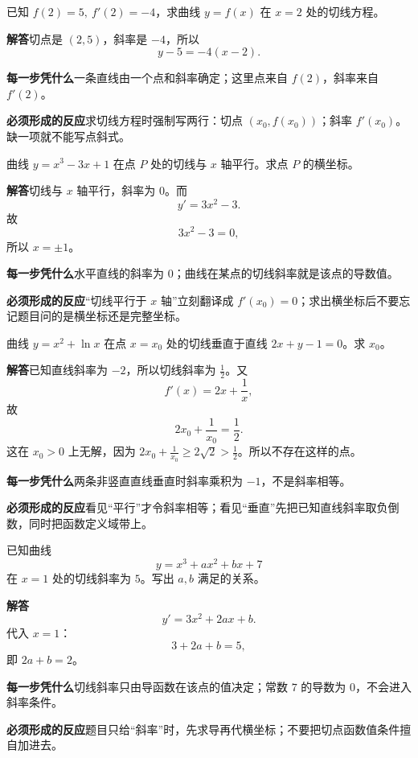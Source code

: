 \documentclass[11pt,fontset=fandol]{ctexart}
\newcommand{\answer}{\par\textbf{解答}\quad}
\newcommand{\basis}{\par\textbf{每一步凭什么}\quad}
\newcommand{\reaction}{\par\textbf{必须形成的反应}\quad}
\newenvironment{drill}[2]{
  \begin{tcolorbox}[colback=white,colframe=black!35,title={#1\quad\small #2},breakable]
}{\end{tcolorbox}}
\begin{document}
\begin{drill}{4. 切线方程需要两个信息}{甲种本《微积分初步》切线习题改编}
已知 $f(2)=5,\ f'(2)=-4$，求曲线 $y=f(x)$ 在 $x=2$ 处的切线方程。

\answer 切点是 $(2,5)$，斜率是 $-4$，所以
\[
y-5=-4(x-2).
\]

\basis 一条直线由一个点和斜率确定；这里点来自 $f(2)$，斜率来自 $f'(2)$。

\reaction 求切线方程时强制写两行：切点 $(x_0,f(x_0))$；斜率 $f'(x_0)$。缺一项就不能写点斜式。
\end{drill}

\begin{drill}{5. 与 $x$ 轴平行翻译成导数为零}{项目导数题库改编}
曲线 $y=x^3-3x+1$ 在点 $P$ 处的切线与 $x$ 轴平行。求点 $P$ 的横坐标。

\answer 切线与 $x$ 轴平行，斜率为 $0$。而
\[
y'=3x^2-3.
\]
故
\[
3x^2-3=0,
\]
所以 $x=\pm1$。

\basis 水平直线的斜率为 $0$；曲线在某点的切线斜率就是该点的导数值。

\reaction “切线平行于 $x$ 轴”立刻翻译成 $f'(x_0)=0$；求出横坐标后不要忘记题目问的是横坐标还是完整坐标。
\end{drill}

\begin{drill}{6. 垂直不是斜率相等}{项目导数题库改编}
曲线 $y=x^2+\ln x$ 在点 $x=x_0$ 处的切线垂直于直线 $2x+y-1=0$。求 $x_0$。

\answer 已知直线斜率为 $-2$，所以切线斜率为 $\frac12$。又
\[
f'(x)=2x+\frac1x,
\]
故
\[
2x_0+\frac1{x_0}=\frac12.
\]
这在 $x_0>0$ 上无解，因为 $2x_0+\frac1{x_0}\ge2\sqrt2>\frac12$。所以不存在这样的点。

\basis 两条非竖直直线垂直时斜率乘积为 $-1$，不是斜率相等。

\reaction 看见“平行”才令斜率相等；看见“垂直”先把已知直线斜率取负倒数，同时把函数定义域带上。
\end{drill}

\begin{drill}{7. 常数项求导后消失}{甲种本《微积分初步》求导习题改编}
已知曲线
\[
y=x^3+ax^2+bx+7
\]
在 $x=1$ 处的切线斜率为 $5$。写出 $a,b$ 满足的关系。

\answer
\[
y'=3x^2+2ax+b.
\]
代入 $x=1$：
\[
3+2a+b=5,
\]
即 $2a+b=2$。

\basis 切线斜率只由导函数在该点的值决定；常数 $7$ 的导数为 $0$，不会进入斜率条件。

\reaction 题目只给“斜率”时，先求导再代横坐标；不要把切点函数值条件擅自加进去。
\end{drill}
\end{document}
